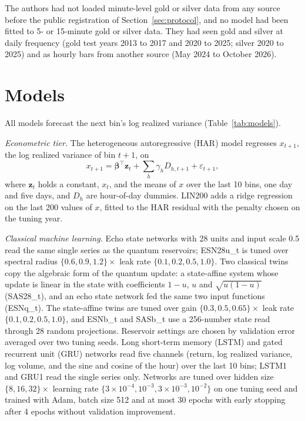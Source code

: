 \documentclass{ieeeaccess}
\begin{document}
The authors had not loaded minute-level gold or silver data from any source before the public registration of Section~\ref{sec:protocol}, and no model had been fitted to 5- or 15-minute gold or silver data. They had seen gold and silver at daily frequency (gold test years 2013 to 2017 and 2020 to 2025; silver 2020 to 2025) and as hourly bars from another source (May 2024 to October 2026).

\section{Models}
\label{sec:models}
All models forecast the next bin's log realized variance (Table~\ref{tab:models}).

\textit{Econometric tier.} The heterogeneous autoregressive (HAR) model \cite{corsi2009} regresses $x_{t+1}$, the log realized variance of bin $t+1$, on
\begin{equation}
x_{t+1}=\boldsymbol{\beta}^{\top}\mathbf{z}_t+\textstyle\sum_{h}\gamma_h D_{h,t+1}+\varepsilon_{t+1},
\label{eq:har}
\end{equation}
where $\mathbf{z}_t$ holds a constant, $x_t$, and the means of $x$ over the last 10 bins, one day and five days, and $D_h$ are hour-of-day dummies. LIN200 adds a ridge regression on the last 200 values of $x$, fitted to the HAR residual with the penalty chosen on the tuning year.

\textit{Classical machine learning.} Echo state networks \cite{jaeger2004} with 28 units and input scale 0.5 read the same single series as the quantum reservoirs; ESN28u\_t is tuned over spectral radius $\{0.6,0.9,1.2\}\times$ leak rate $\{0.1,0.2,0.5,1.0\}$. Two classical twins copy the algebraic form of the quantum update: a state-affine system whose update is linear in the state with coefficients $1-u$, $u$ and $\sqrt{u(1-u)}$ (SAS28\_t), and an echo state network fed the same two input functions (ESNq\_t). The state-affine twins are tuned over gain $\{0.3,0.5,0.65\}\times$ leak rate $\{0.1,0.2,0.5,1.0\}$, and ESNb\_t and SASb\_t use a 256-number state read through 28 random projections. Reservoir settings are chosen by validation error averaged over two tuning seeds. Long short-term memory (LSTM) \cite{hochreiter1997} and gated recurrent unit (GRU) \cite{cho2014} networks read five channels (return, log realized variance, log volume, and the sine and cosine of the hour) over the last 10 bins; LSTM1 and GRU1 read the single series only. Networks are tuned over hidden size $\{8,16,32\}\times$ learning rate $\{3\times10^{-4},10^{-3},3\times10^{-3},10^{-2}\}$ on one tuning seed and trained with Adam, batch size 512 and at most 30 epochs with early stopping after 4 epochs without validation improvement.
\end{document}
